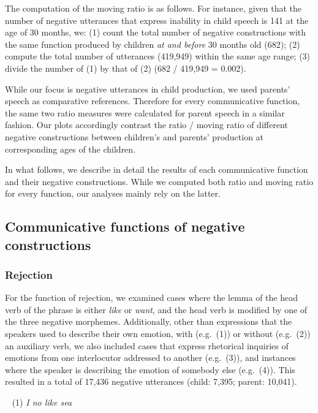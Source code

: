 \documentclass[10pt, letterpaper]{article}
\begin{document}
The computation of the moving ratio is as follows. For instance, given
that the number of negative utterances that express inability in child
speech is 141 at the age of 30 months, we: (1) count the total number of
negative constructions with the same function produced by children
\emph{at and before} 30 months old (682); (2) compute the total number
of utterances (419,949) within the same age range; (3) divide the number
of (1) by that of (2) (682 / 419,949 = 0.002).

While our focus is negative utterances in child production, we used
parents' speech as comparative references. Therefore for every
communicative function, the same two ratio measures were calculated for
parent speech in a similar fashion. Our plots accordingly contrast the
ratio / moving ratio of different negative constructions between
children's and parents' production at corresponding ages of the
children.

In what follows, we describe in detail the results of each communicative
function and their negative constructions. While we computed both ratio
and moving ratio for every function, our analyses mainly rely on the
latter.

\hypertarget{communicative-functions-of-negative-constructions}{%
\subsection{Communicative functions of negative
constructions}\label{communicative-functions-of-negative-constructions}}

\hypertarget{rejection}{%
\subsubsection{Rejection}\label{rejection}}

For the function of rejection, we examined cases where the lemma of the
head verb of the phrase is either \emph{like} or \emph{want}, and the
head verb is modified by one of the three negative morphemes.
Additionally, other than expressions that the speakers used to describe
their own emotion, with (e.g.~(1)) or without (e.g.~(2)) an auxiliary
verb, we also included cases that express rhetorical inquiries of
emotions from one interlocutor addressed to another (e.g.~(3)), and
instances where the speaker is describing the emotion of somebody else
(e.g.~(4)). This resulted in a total of 17,436 negative utterances
(child: 7,395; parent: 10,041).

~ (1) \emph{I no like sea}
\end{document}
